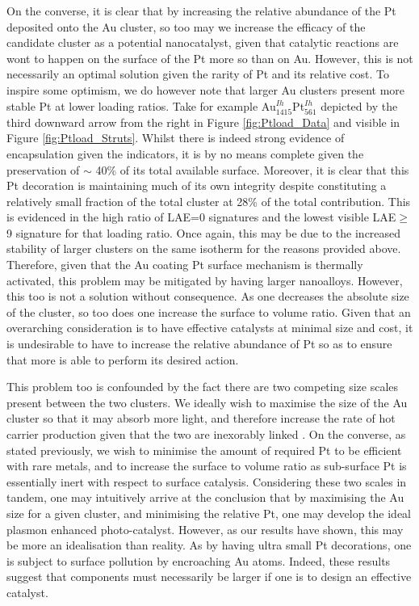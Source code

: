 On the converse, it is clear that by increasing the relative abundance of the Pt deposited onto the Au cluster, so too may we increase the efficacy of the candidate cluster as a potential nanocatalyst, given that catalytic reactions are wont to happen on the surface of the Pt more so than on Au. However, this is not necessarily an optimal solution given the rarity of Pt and its relative cost. To inspire some optimism, we do however note that larger Au clusters present more stable Pt at lower loading ratios. Take for example Au$_{1415}^{Ih}$Pt$_{561}^{Ih}$  depicted by the third downward arrow from the right in Figure \ref{fig:Ptload_Data} and visible in Figure \ref{fig:Ptload_Struts}. Whilst there is indeed strong evidence of encapsulation given the indicators, it is by no means complete given the preservation of $\sim$ 40\% of its total available surface. Moreover, it is clear that this Pt decoration is maintaining much of its own integrity despite constituting a relatively small fraction of the total cluster at 28\% of the total contribution. This is evidenced in the high ratio of LAE=0 signatures and the lowest visible LAE$\geq$9 signature for that loading ratio. Once again, this may be due to the increased stability of larger clusters on the same isotherm for the reasons provided above. Therefore, given that the Au coating Pt surface mechanism is thermally activated, this problem may be mitigated by having larger nanoalloys. However, this too is not a solution without consequence. As one decreases the absolute size of the cluster, so too does one increase the surface to volume ratio. Given that an overarching consideration is to have effective catalysts at minimal size and cost, it is undesirable to have to increase the relative abundance of Pt so as to ensure that more is able to perform its desired action.

This problem too is confounded by the fact there are two competing size scales present between the two clusters. We ideally wish to maximise the size of the Au cluster so that it may absorb more light, and therefore increase the rate of hot carrier production given that the two are inexorably linked \cite{AuPlasmonRev}. On the converse, as stated previously, we wish to minimise the amount of required Pt to be efficient with rare metals, and to increase the surface to volume ratio as sub-surface Pt is essentially inert with respect to surface catalysis. Considering these two scales in tandem, one may intuitively arrive at the conclusion that by maximising the Au size for a given cluster, and minimising the relative Pt, one may develop the ideal plasmon enhanced photo-catalyst. However, as our results have shown, this may be more an idealisation than reality. As by having ultra small Pt decorations, one is subject to surface pollution by encroaching Au atoms. Indeed, these results suggest that components must necessarily be larger if one is to design an effective catalyst.

